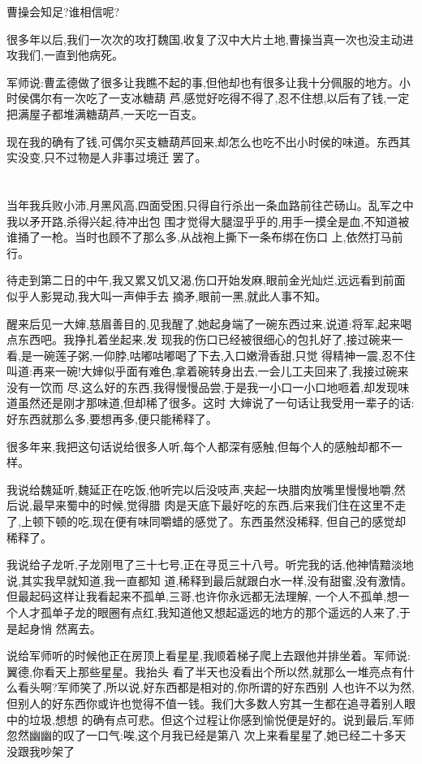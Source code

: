 ﻿\documentclass[12pt,twocolumn]{article}
\begin{document}
曹操会知足?谁相信呢?

很多年以后,我们一次次的攻打魏国,收复了汉中大片土地,曹操当真一次也没主动进攻我们,一直到他病死。

军师说:曹孟德做了很多让我瞧不起的事,但他却也有很多让我十分佩服的地方。小时侯偶尔有一次吃了一支冰糖葫
芦,感觉好吃得不得了,忍不住想,以后有了钱,一定把满屋子都堆满糖葫芦,一天吃一百支。

现在我的确有了钱,可偶尔买支糖葫芦回来,却怎么也吃不出小时侯的味道。东西其实没变,只不过物是人非事过境迁
罢了。

\section{}

当年我兵败小沛,月黑风高,四面受困,只得自行杀出一条血路前往芒砀山。乱军之中我以矛开路,杀得兴起,待冲出包
围才觉得大腿湿乎乎的,用手一摸全是血,不知道被谁捅了一枪。当时也顾不了那么多,从战袍上撕下一条布绑在伤口
上,依然打马前行。

待走到第二日的中午,我又累又饥又渴,伤口开始发麻,眼前金光灿烂,远远看到前面似乎人影晃动,我大叫一声伸手去
摘矛,眼前一黑,就此人事不知。

醒来后见一大婶,慈眉善目的,见我醒了,她起身端了一碗东西过来,说道:将军,起来喝点东西吧。我挣扎着坐起来,发
现我的伤口已经被很细心的包扎好了,接过碗来一看,是一碗莲子粥,一仰脖,咕嘟咕嘟喝了下去,入口嫩滑香甜,只觉
得精神一震,忍不住叫道:再来一碗!大婶似乎面有难色,拿着碗转身出去,一会儿工夫回来了,我接过碗来没有一饮而
尽,这么好的东西,我得慢慢品尝,于是我一小口一小口地咂着,却发现味道虽然还是刚才那味道,但却稀了很多。这时
大婶说了一句话让我受用一辈子的话:好东西就那么多,要想再多,便只能稀释了。

很多年来,我把这句话说给很多人听,每个人都深有感触,但每个人的感触却都不一样。

我说给魏延听,魏延正在吃饭,他听完以后没吱声,夹起一块腊肉放嘴里慢慢地嚼,然后说,最早来蜀中的时候,觉得腊
肉是天底下最好吃的东西,后来我们住在这里不走了,上顿下顿的吃,现在便有味同嚼蜡的感觉了。东西虽然没稀释,
但自己的感觉却稀释了。

我说给子龙听,子龙刚甩了三十七号,正在寻觅三十八号。听完我的话,他神情黯淡地说,其实我早就知道,我一直都知
道,稀释到最后就跟白水一样,没有甜蜜,没有激情。但最起码这样让我看起来不孤单,三哥,也许你永远都无法理解,
一个人不孤单,想一个人才孤单\dldots 子龙的眼圈有点红,我知道他又想起遥远的地方的那个遥远的人来了,于是起身悄
然离去。

说给军师听的时候他正在房顶上看星星,我顺着梯子爬上去跟他并排坐着。军师说:翼德,你看天上那些星星。我抬头
看了半天也没看出个所以然,就那么一堆亮点有什么看头啊?军师笑了,所以说,好东西都是相对的,你所谓的好东西别
人也许不以为然,但别人的好东西你或许也觉得不值一钱。我们大多数人穷其一生都在追寻着别人眼中的垃圾,想想
的确有点可悲。但这个过程让你感到愉悦便是好的。说到最后,军师忽然幽幽的叹了一口气:唉,这个月我已经是第八
次上来看星星了,她已经二十多天没跟我吵架了\dldots
\end{document}
